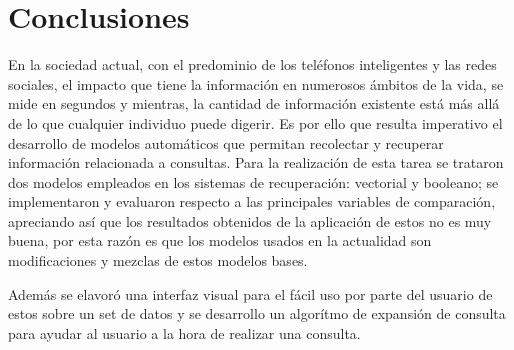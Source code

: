 \documentclass{llncs}
\begin{document}
\section{Conclusiones}

En la sociedad actual, con el predominio de los teléfonos inteligentes y las redes sociales, el impacto que tiene la información en numerosos ámbitos de la vida, se mide en segundos y mientras, la cantidad de información existente está más allá de lo que cualquier individuo puede digerir. Es por ello que resulta imperativo el desarrollo de modelos automáticos que permitan recolectar y recuperar información relacionada a consultas. Para la realización de esta tarea se trataron dos modelos empleados en los sistemas de recuperación: vectorial y booleano; se implementaron y evaluaron respecto a las principales variables de comparación, apreciando así que los resultados obtenidos de la aplicación de estos no es muy buena, por esta razón es que los modelos usados en la actualidad son modificaciones y mezclas de estos modelos bases.

Además se elavoró una interfaz visual para el fácil uso por parte del usuario de estos sobre un set de datos y se desarrollo un algorítmo de expansión de consulta para ayudar al usuario a la hora de realizar una consulta.
\end{document}
